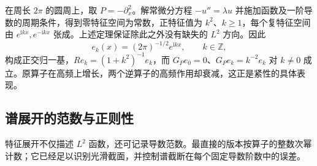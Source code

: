 \begin{example}\label{g3:exm:circle-elliptic-spectrum}
	在周长 \(2\pi\) 的圆周上，取 \(P=-\partial_x^2\)。解常微分方程 \(-u''=\lambda u\) 并施加函数及一阶导数的周期条件，得到零特征空间为常数，正特征值为 \(k^2\)、\(k\ge1\)，每个复特征空间由 \(e^{\mathrm ikx},e^{-\mathrm ikx}\) 张成。上述定理保证除此之外没有缺失的 \(L^2\) 方向。因此
	\[
		e_k(x)=(2\pi)^{-1/2}e^{\mathrm ikx},\qquad k\in\mathbb Z,
	\]
	构成正交归一基，\(Re_k=(1+k^2)^{-1}e_k\)，而 \(G_Pe_0=0\)、\(G_Pe_k=k^{-2}e_k\) 对 \(k\ne0\) 成立。原算子在高频上增长，两个逆算子的高频作用却衰减，这正是紧性的具体表现。
\end{example}

\subsection{谱展开的范数与正则性}
\label{g3:subsec:1303:04}
特征展开不仅描述 \(L^2\) 函数，还可记录导数范数。最直接的版本按算子的整数次幂计数；它已经足以识别光滑截面，并控制谱截断在每个固定导数阶数中的误差。

